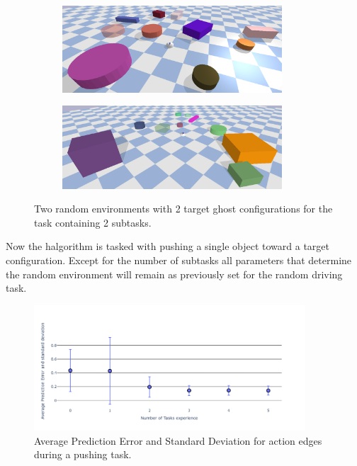 \begin{figure}[H]
    \centering
    \begin{subfigure}{\textwidth}
    \centering
    \includegraphics[width=0.9\textwidth]{figures/results/random_1}
    \end{subfigure}

    \vspace{0.2cm}
    \begin{subfigure}{\textwidth}
    \centering
    \includegraphics[width=0.9\textwidth]{figures/results/random_2}
    \end{subfigure}
    \caption{Two random environments with 2 target ghost configurations for the task containing 2 subtasks.}%
    \label{fig:random_environnment}
\end{figure}


Now the \ac{halgorithm} is tasked with pushing a single object toward a target configuration. Except for the number of subtasks all parameters that determine the random environment will remain as previously set for the random driving task.\bs

\begin{figure}[H]
    \centering
    \includegraphics[width=0.9\textwidth]{figures/results/random_pe_push_kgraph}
    \caption{Average Prediction Error and Standard Deviation for action edges during a pushing task.}%
    \label{fig:rand_push_full_pred}
\end{figure}

